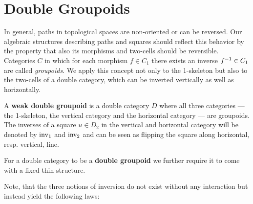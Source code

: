 \section{Double Groupoids}

In general, paths in topological spaces are non-oriented or can be reversed.
Our algebraic structures describing paths and squares should reflect this behavior
by the property that also its morphisms and two-cells should be reversible.
Categories $C$ in which for each morphism $f \in C_1$ there exists an inverse
$f^{-1} \in C_1$ are called \emph{groupoids}. We apply this concept not only
to the 1-skeleton but also to the two-cells of a
double category, which can be inverted vertically as well as horizontally.

\begin{defn} \label{def:weak-dbl-gpd}
A \textbf{weak double groupoid} is a double category $D$ where all three categories
--- the 1-skeleton, the vertical category and the horizontal category --- are
groupoids. The inverses of a square $u \in D_2$ in the vertical and horizontal category 
will be denoted by $\operatorname{inv_1}$ and $\operatorname{inv_2}$ and can be seen as flipping the square
along horizontal, resp. vertical, line.

For a double category to be a \textbf{double groupoid} we further require it to
come with a fixed thin structure.
\end{defn}

Note, that the three notions of inversion do not exist without any interaction
but instead yield the following laws:

